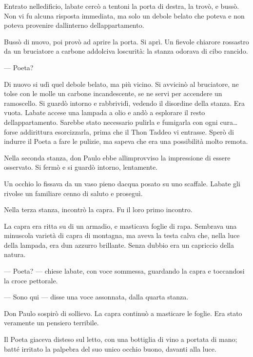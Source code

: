 Entrato nell\textquotesingle edificio, l\textquotesingle abate cercò a
tentoni la porta di destra, la trovò, e bussò. Non vi fu alcuna risposta
immediata, ma solo un debole belato che poteva e non poteva provenire
dall\textquotesingle interno dell\textquotesingle appartamento.

Bussò di nuovo, poi provò ad aprire la porta. Si aprì. Un fievole
chiarore rossastro da un bruciatore a carbone addolciva
l\textquotesingle oscurità: la stanza odorava di cibo rancido.

--- Poeta?

Di nuovo si udì quel debole belato, ma più vicino. Si avvicinò al
bruciatore, ne tolse con le molle un carbone incandescente, se ne servi
per accendere un ramoscello. Si guardò intorno e rabbrividì, vedendo il
disordine della stanza. Era vuota. L\textquotesingle abate accese una
lampada a olio e andò a esplorare il resto
dell\textquotesingle appartamento. Sarebbe stato necessario pulirla e
fumigarla con ogni cura\ldots{} forse addirittura esorcizzarla, prima
che il Thon Taddeo vi entrasse. Sperò di indurre il Poeta a fare le
pulizie, ma sapeva che era una possibilità molto remota.

Nella seconda stanza, don Paulo ebbe all\textquotesingle improvviso la
impressione di essere osservato. Si fermò e si guardò intorno,
lentamente.

Un occhio lo fissava da un vaso pieno d\textquotesingle acqua posato su
uno scaffale. L\textquotesingle abate gli rivolse un familiare cenno di
saluto e proseguì.

Nella terza stanza, incontrò la capra. Fu il loro primo incontro.

La capra era ritta su di un armadio, e masticava foglie di rapa.
Sembrava una minuscola varietà di capra di montagna, ma aveva la testa
calva che, nella luce della lampada, era d\textquotesingle un azzurro
brillante. Senza dubbio era un capriccio della natura.

--- Poeta? --- chiese l\textquotesingle abate, con voce sommessa,
guardando la capra e toccandosi la croce pettorale.

--- Sono qui --- disse una voce assonnata, dalla quarta stanza.

Don Paulo sospirò di sollievo. La capra continuò a masticare le foglie.
Era stato veramente un pensiero terribile.

Il Poeta giaceva disteso sul letto, con una bottiglia di vino a portata
di mano; batté irritato la palpebra del suo unico occhio buono, davanti
alla luce.

